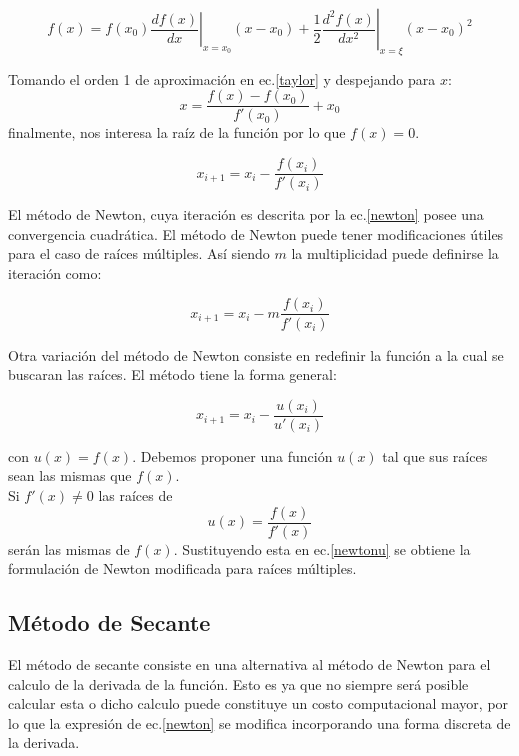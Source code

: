 \documentclass[letterpaper,10pt,oneside]{sphinxmanual}
\theoremstyle{plain}%
\theoremstyle{definition}%
\theoremstyle{remark}%
\newcommand{\derivada}[2]{\frac{d #1}{d#2}}
\newcommand{\derivadan}[3]{\frac{d^{#3} #1}{d#2^{#3}}}
\newcommand{\evaluar}[2]{\left. #1 \right | _{#2}}
\begin{document}
\begin{equation}
 f(x)=f(x_{0})\evaluar{\derivada{f(x)}{x}}{x=x_{0}}(x-x_{0})+\frac{1}{2}\evaluar{\derivadan{f(x)}{x}{2}}{x=\xi}(x-x_{0})^{2} \label{taylor}
\end{equation}

\noindent Tomando el orden 1 de aproximación en ec.\ref{taylor} y despejando para $x$: \[ x=\frac{f(x)-f(x_{0})}{f\prime(x_{0})}+x_{0}\] finalmente, nos interesa la raíz de la función por lo que $f(x)=0$.\medskip

\begin{equation}
 x_{i+1}=x_{i}-\frac{f(x_{i})}{f\prime(x_{i})} \label{newton}
\end{equation}

\noindent El método de Newton, cuya iteración es descrita por la ec.\ref{newton} posee una convergencia cuadrática. El método de Newton puede tener modificaciones útiles para el caso de raíces múltiples. Así siendo $m$ la multiplicidad puede definirse la iteración como:\medskip

\begin{equation}
 x_{i+1}=x_{i}-m\frac{f(x_{i})}{f\prime(x_{i})} \label{mnewton}
\end{equation}

\noindent Otra variación del método de Newton consiste en redefinir la función a la cual se buscaran las raíces. El método tiene la forma general:\medskip

\begin{equation}
x_{i+1}=x_{i}-\frac{u(x_{i})}{u\prime(x_{i})} \label{newtonu}
\end{equation}

\noindent con $u(x)=f(x)$. Debemos proponer una función $u(x)$ tal que sus raíces sean las mismas que $f(x)$.\\
Si $f\prime(x)\neq 0$ las raíces de \[ u(x)=\frac{f(x)}{f\prime(x)}\] serán las mismas de $f(x)$. Sustituyendo esta en ec.\ref{newtonu} se obtiene la formulación de Newton modificada para raíces múltiples.\medskip

\subsection{Método de Secante}

\noindent El método de secante consiste en una alternativa al método de Newton para el calculo de la derivada de la función. Esto es ya que no siempre será posible calcular esta o dicho calculo puede constituye un costo computacional mayor, por lo que la expresión de ec.\ref{newton} se modifica incorporando una forma discreta de la derivada.\medskip
\end{document}
